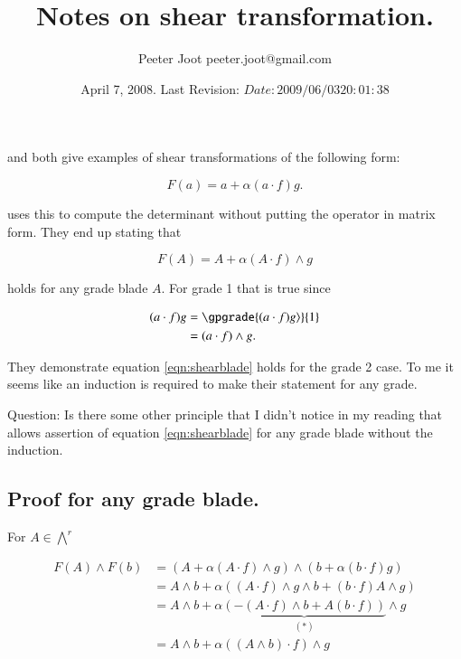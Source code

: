 \documentclass{article}
\title{ Notes on shear transformation. }
\author{Peeter Joot \quad peeter.joot@gmail.com}
\date{ April 7, 2008.  Last Revision: $Date: 2009/06/03 20:01:38 $ }
\begin{document}
\maketitle{}

\section{}

\cite{dorst2007gac} and \cite{doran2003gap}
both give examples of shear transformations of the following
form:

\[
F(a) = a + \alpha(a \cdot f) g.
\]

\cite{doran2003gap}
uses this to compute the determinant without putting the operator in matrix form.  They end up stating that 

\begin{equation}\label{eqn:shearblade}
F(A) = A + \alpha (A \cdot f) \wedge g
\end{equation}

holds for any grade blade $A$.  For grade 1 that is true since

\begin{align*}
(a \cdot f) g 
&= \gpgrade{(a \cdot f) g \rangle}{1} \\
&= (a \cdot f) \wedge g.
\end{align*}

They demonstrate equation \ref{eqn:shearblade}
holds for the grade 2 case.  To me it seems
like an induction is required to make their statement for any grade.

Question: Is there some other principle that I didn't notice in my reading that allows assertion of 
equation \ref{eqn:shearblade}
for any grade blade without the induction.

\subsection{Proof for any grade blade. }

For $A \in {\bigwedge}^r$

\begin{align*}
F(A) \wedge F(b)
&= \left(A + \alpha (A \cdot f) \wedge g \right) \wedge
   \left(b + \alpha(b \cdot f) g \right) \\
&= A \wedge b
 + \alpha 
\left(
(A \cdot f) \wedge g \wedge b
+ (b \cdot f) A \wedge g 
\right) \\
&= A \wedge b
 + \alpha 
\underbrace{
\left(
-(A \cdot f) \wedge b
+ A (b \cdot f) 
\right)
}_{(*)} 
\wedge g
\\
&= A \wedge b + \alpha ((A \wedge b) \cdot f) \wedge g
\end{align*}
\end{document}
